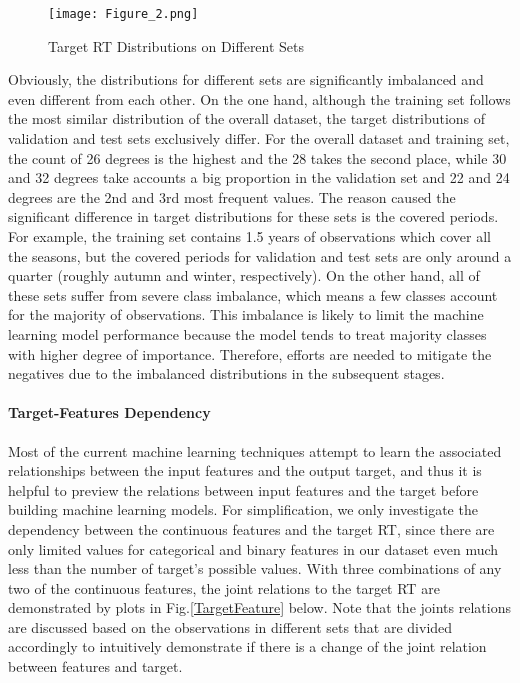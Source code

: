 \documentclass[11pt]{article}
\begin{document}
    \begin{figure}[htbp]
    	\centering
    	\texttt{[image: Figure\_2.png]}
    	\caption{Target RT Distributions on Different Sets}
    	\label{TargetDistribution}
    \end{figure}
    
    Obviously, the distributions for different sets are significantly imbalanced and even different from each other. On the one hand, although the training set follows the most similar distribution of the overall dataset, the target distributions of validation and test sets exclusively differ. For the overall dataset and training set, the count of 26 degrees is the highest and the 28 takes the second place, while 30 and 32 degrees take accounts a big proportion in the validation set and 22 and 24 degrees are the 2nd and 3rd most frequent values. The reason caused the significant difference in target distributions for these sets is the covered periods. For example, the training set contains 1.5 years of observations which cover all the seasons, but the covered periods for validation and test sets are only around a quarter (roughly autumn and winter, respectively). On the other hand, all of these sets suffer from severe class imbalance, which means a few classes account for the majority of observations. This imbalance is likely to limit the machine learning model performance because the model tends to treat majority classes with higher degree of importance. Therefore, efforts are needed to mitigate the negatives due to the imbalanced distributions in the subsequent stages.
    
    \paragraph{Target-Features Dependency}
    Most of the current machine learning techniques attempt to learn the associated relationships between the input features and the output target, and thus it is helpful to preview the relations between input features and the target before building machine learning models. For simplification, we only investigate the dependency between the continuous features and the target RT, since there are only limited values for categorical and binary features in our dataset even much less than the number of target’s possible values. With three combinations of any two of the continuous features, the joint relations to the target RT are demonstrated by plots in Fig.\ref{TargetFeature} below. Note that the joints relations are discussed based on the observations in different sets that are divided accordingly to intuitively demonstrate if there is a change of the joint relation between features and target.
    
\end{document}
